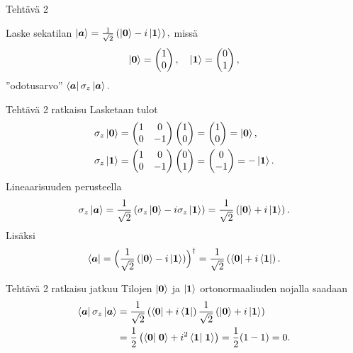 \documentclass[12pt, a4paper, t]{beamer}
\theoremstyle{exercise}
\theoremstyle{remark}
\theoremstyle{definition}
\newcommand{\vek}[1]{\mbox{\boldmath$#1$}}
\renewcommand{\vec}[1]{\vek{#1}}
\newcommand{\bra}[1]{\ensuremath{\left\langle#1\right|}}
\newcommand{\ket}[1]{\ensuremath{\left|#1\right\rangle}}
\newcommand{\bracket}[2]{\ensuremath{\left\langle#1 \vphantom{#2}\right| \left. #2 \vphantom{#1}\right\rangle}}
\newcommand{\matrixel}[3]{\ensuremath{\left\langle #1 \vphantom{#2#3} \right| #2 \left| #3 \vphantom{#1#2} \right\rangle}}
\begin{document}
\begin{frame}{Tehtävä 2}
\vspace{22pt}
\begin{tcolorbox}
Laske sekatilan $\ket{\vec{a}}=\frac{1}{\sqrt{2}}\left( \ket{\vec{0}}-i\ket{\vec{1}}\right),$ missä 
$$
\ket{\vec{0}}=\begin{pmatrix}
1\\
0
\end{pmatrix},\quad \ket{\vec{1}}=\begin{pmatrix}
0\\
1
\end{pmatrix},
$$
''odotusarvo'' $\matrixel{\vec{a}}{\sigma_z}{\vec{a}}.$
\end{tcolorbox}
\end{frame}
\begin{frame}{Tehtävä 2 ratkaisu}
\vspace{12pt}
Lasketaan tulot
\begin{align*}
\sigma_z\ket{\vec{0}}&=\begin{pmatrix}
1 & 0\\
0 & -1 \\
\end{pmatrix}\begin{pmatrix}
1\\
0
\end{pmatrix}=\begin{pmatrix}
1\\
0
\end{pmatrix}=\ket{\vec{0}},\\
\sigma_z\ket{\vec{1}}&=\begin{pmatrix}
1 & 0\\
0 & -1 \\
\end{pmatrix}\begin{pmatrix}
0\\
1
\end{pmatrix}=\begin{pmatrix}
0\\
-1
\end{pmatrix}=-\ket{\vec{1}}.
\end{align*}
Lineaarisuuden perusteella
$$
\sigma_z\ket{\vec{a}}=\frac{1}{\sqrt{2}}\left( \sigma_z\ket{\vec{0}}-i\sigma_z\ket{\vec{1}}\right)=\frac{1}{\sqrt{2}}\left(\ket{\vec{0}}+i\ket{\vec{1}}\right).
$$
Lisäksi
$$
\bra{\vec{a}}=\Bigl(\frac{1}{\sqrt{2}}\left( \ket{\vec{0}}-i\ket{\vec{1}}\right)\Bigr)^{\dagger}=
\frac{1}{\sqrt{2}}\left( \bra{\vec{0}}+i\bra{\vec{1}}\right).
$$
\end{frame}
\begin{frame}{Tehtävä 2 ratkaisu jatkuu}
\vspace{12pt}
Tilojen $\ket{\vec{0}}$ ja $\ket{\vec{1}}$ ortonormaaliuden nojalla saadaan
\begin{align*}
\matrixel{\vec{a}}{\sigma_z}{\vec{a}}&=\frac{1}{\sqrt{2}}\left( \bra{\vec{0}}+i\bra{\vec{1}}\right)\frac{1}{\sqrt{2}}\left(\ket{\vec{0}}+i\ket{\vec{1}}\right)\\
&=\frac{1}{2}\left( \bracket{\vec{0}}{\vec{0}}+i^2\bracket{\vec{1}}{\vec{1}}\right)=\frac{1}{2}(1-1)=0.
\end{align*}
\end{frame}
\end{document}
